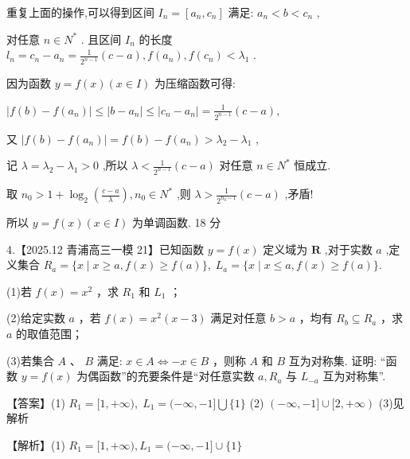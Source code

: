 \documentclass[10pt]{article}
\begin{document}
重复上面的操作,可以得到区间 \({I}_{n} = \left\lbrack  {{a}_{n},{c}_{n}}\right\rbrack\) 满足: \({a}_{n} < b < {c}_{n}\) ,

对任意 \(n \in  {N}^{ * }\) . 且区间 \({I}_{n}\) 的长度 \({l}_{n} = {c}_{n} - {a}_{n} = \frac{1}{{2}^{n - 1}}\left( {c - a}\right) ,f\left( {a}_{n}\right) ,f\left( {c}_{n}\right)  < {\lambda }_{1}\) .

因为函数 \(y = f\left( x\right) \left( {x \in  I}\right)\) 为压缩函数可得:

\(\left| {f\left( b\right)  - f\left( {a}_{n}\right) }\right|  \leq  \left| {b - {a}_{n}}\right|  \leq  \left| {{c}_{n} - {a}_{n}}\right|  = \frac{1}{{2}^{n - 1}}\left( {c - a}\right) ,\)

又 \(\left| {f\left( b\right)  - f\left( {a}_{n}\right) }\right|  = f\left( b\right)  - f\left( {a}_{n}\right)  > {\lambda }_{2} - {\lambda }_{1}\) ,

记 \(\lambda  = {\lambda }_{2} - {\lambda }_{1} > 0\) ,所以 \(\lambda  < \frac{1}{{2}^{n - 1}}\left( {c - a}\right)\) 对任意 \(n \in  {N}^{ * }\) 恒成立.

取 \({n}_{0} > 1 + {\log }_{2}\left( \frac{c - a}{\lambda }\right) ,{n}_{0} \in  {N}^{ * }\) ,则 \(\lambda  > \frac{1}{{2}^{{n}_{0} - 1}}\left( {c - a}\right)\) ,矛盾!

所以 \(y = f\left( x\right) \left( {x \in  I}\right)\) 为单调函数. 18 分

4.【2025.12 青浦高三一模 21】已知函数 \(y = f\left( x\right)\) 定义域为 \(\mathbf{R}\) ,对于实数 \(a\) ,定义集合 \({R}_{a} = \{ x \mid  x \geq  a,f\left( x\right)  \geq  f\left( a\right) \} ,\;{L}_{a} = \{ x \mid  x \leq  a,f\left( x\right)  \geq  f\left( a\right) \} .\)

(1)若 \(f\left( x\right)  = {x}^{2}\) ，求 \({R}_{1}\) 和 \({L}_{1}\) ；

(2)给定实数 \(a\) ，若 \(f\left( x\right)  = {x}^{2}\left( {x - 3}\right)\) 满足对任意 \(b > a\) ，均有 \({R}_{b} \subseteq  {R}_{a}\) ，求 \(a\) 的取值范围；

(3)若集合 \(A\text{ 、 }B\) 满足: \(x \in  A \Leftrightarrow   - x \in  B\) ，则称 \(A\) 和 \(B\) 互为对称集. 证明: “函数 \(y = f\left( x\right)\) 为偶函数”的充要条件是“对任意实数 \(a,{R}_{a}\) 与 \({L}_{-a}\) 互为对称集”.

【答案】(1) \({R}_{1} = \lbrack 1, + \infty ),\;{L}_{1} = ( - \infty , - 1\rbrack \bigcup \{ 1\}\) (2) \(\left( {-\infty , - 1\rbrack \cup \lbrack 2, + \infty }\right)\) (3)见解析

【解析】(1) \({R}_{1} = \lbrack 1, + \infty ),{L}_{1} = ( - \infty , - 1\rbrack  \cup  \{ 1\}\)
\end{document}
